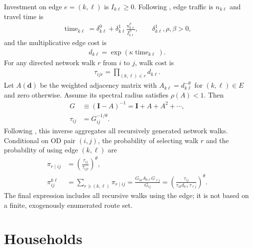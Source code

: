 \documentclass[12pt,a4paper]{article}
\newcommand{\1}{\mathbb 1}
\begin{document}
Investment on edge $e=(k,\ell)$ is $I_{k\ell}\geq0$. Following \citet{Fajgelbaum2020-yv}, edge traffic is $n_{k\ell}$ and travel time is
\begin{align}
\operatorname{time}_{k\ell}
=
\delta_{k\ell}^0+
\delta_{k\ell}^1\frac{n_{k\ell}^{\rho}}{I_{k\ell}^{\beta}},
\qquad
\delta_{k\ell}^1,\rho,\beta>0,
\label{eq:edge-time}
\end{align}
and the multiplicative edge cost is
\begin{align}
d_{k\ell}=\exp\!\left(\kappa\operatorname{time}_{k\ell}\right).
\label{eq:edge-cost}
\end{align}
For any directed network walk $r$ from $i$ to $j$, walk cost is
\begin{align}
\tau_{ijr}
=
\prod_{(k,\ell)\in r}d_{k\ell}.
\label{eq:walk-cost}
\end{align}
Let $A(\mathbf d)$ be the weighted adjacency matrix with
$A_{k\ell}=d_{k\ell}^{-\theta}$ for $(k,\ell)\in E$ and zero otherwise. Assume its spectral radius satisfies $\rho(A)<1$. Then
\begin{align}
G
&\equiv
(\mathbf I-A)^{-1}
=
\mathbf I+A+A^2+\cdots,
\label{eq:recursive-G}\\
\tau_{ij}
&=
G_{ij}^{-1/\theta}.
\label{eq:route-costs}
\end{align}
Following \citet{Allen2022-ms}, this inverse aggregates all recursively generated network walks. Conditional on OD pair $(i,j)$, the probability of selecting walk $r$ and the probability of using edge $(k,\ell)$ are
\begin{align}
\pi_{r\mid ij}
&=
\left(\frac{\tau_{ij}}{\tau_{ijr}}\right)^\theta,
\label{eq:route-share}\\
\pi_{ij}^{k\ell}
&=
\sum_{r\ni(k,\ell)}\pi_{r\mid ij}
=
\frac{G_{ik}A_{k\ell}G_{\ell j}}{G_{ij}}
=
\left(
\frac{\tau_{ij}}
{\tau_{ik}d_{k\ell}\tau_{\ell j}}
\right)^\theta.
\label{eq:edge-use-share}
\end{align}
The final expression includes all recursive walks using the edge; it is not based on a finite, exogenously enumerated route set.

\section{Households}
\end{document}
